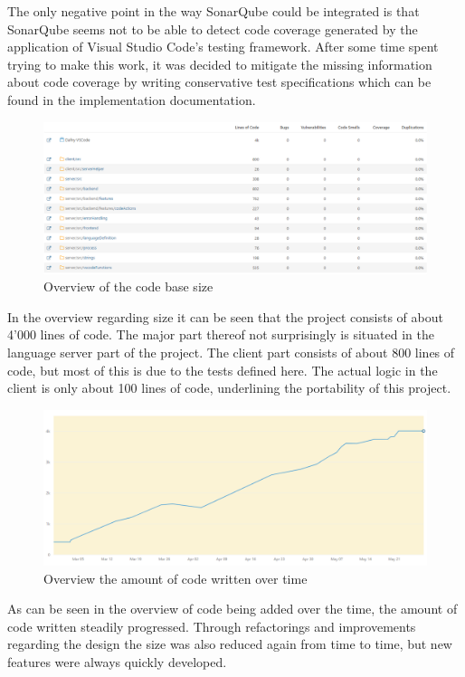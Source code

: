 The only negative point in the way SonarQube could be integrated is that SonarQube seems not to be able to detect code coverage generated by the application of Visual Studio Code's testing framework. After some time spent trying to make this work, it was decided to mitigate the missing information about code coverage by writing conservative test specifications which can be found in the implementation documentation.\newline
\begin{figure}[H]
	\centering
	\includegraphics[width=1\textwidth]{img/sonarSize}
	\caption{Overview of the code base size}
	\label{fig:sonarQubeSizeOverview}
\end{figure}
In the overview regarding size it can be seen that the project consists of about 4'000 lines of code. The major part thereof not surprisingly is situated in the language server part of the project. The client part consists of about 800 lines of code, but most of this is due to the tests defined here. The actual logic in the client is only about 100 lines of code, underlining the portability of this project.\newline
\begin{figure}[H]
	\centering
	\includegraphics[width=1\textwidth]{img/sonarTime}
	\caption{Overview the amount of code written over time}
	\label{fig:sonarQubeTimeOverview}
\end{figure}
As can be seen in the overview of code being added over the time, the amount of code written steadily progressed. Through refactorings and improvements regarding the design the size was also reduced again from time to time, but new features were always quickly developed.\newline
